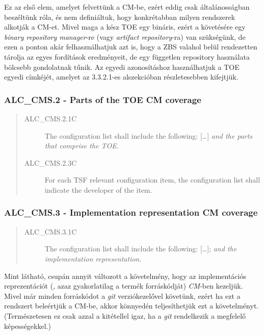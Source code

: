 Ez az első elem, amelyet felvettünk a CM-be, ezért eddig csak általánosságban beszéltünk róla, és
nem definiáltuk, hogy konkrétabban milyen rendszerek alkotják a CM-et.  Mivel maga a kész TOE egy
bináris, ezért a követésére egy \emph{binary repository manager}-re (vagy \emph{artifact
repository}-ra) van szükségünk, de ezen a ponton akár felhasználhatjuk azt is, hogy a ZBS valahol
belül rendezetten tárolja az egyes fordítások eredményeit, de egy független repository használata
bölcsebb gondolatnak tűnik.  Az egyedi azonosításhoz használhatjuk a TOE egyedi címkéjét, amelyet az
3.3.2.1-es alszekcióban részletesebben kifejtjük.

\pagebreak[3]
\subsubsection{ALC\_CMS.2 - Parts of the TOE CM coverage}
\begin{quote}
    \begin{description}
        \item[ALC\_CMS.2.1C]{The configuration list shall include the following: [\ldots] \emph{and
            the parts that comprise the TOE}.}
        \item[ALC\_CMS.2.3C]{For each TSF relevant configuration item, the configuration list shall
            indicate the developer of the item.}
    \end{description}
\end{quote}


\pagebreak[3]
\subsubsection{ALC\_CMS.3 - Implementation representation CM coverage}
\begin{quote}
    \begin{description}
        \item[ALC\_CMS.3.1C]{The configuration list shall include the following: [\ldots];
            \emph{and the implementation representation}.}
    \end{description}
\end{quote}

Mint látható, csupán annyit változott a követelmény, hogy az implementációs reprezentációt (, azaz
gyakorlatilag a termék forráskódját) \emph{CM}-ben kezeljük. Mivel már minden forráskódot
a \emph{git} verziókezelővel követünk, ezért ha ezt a rendszert beleértjük a CM-be, akkor könnyedén
teljesíthetjük ezt a követelményt. (Természetesen ez csak azzal a kitétellel igaz, ha a \emph{git}
rendelkezik a megfelelő képességekkel.)

